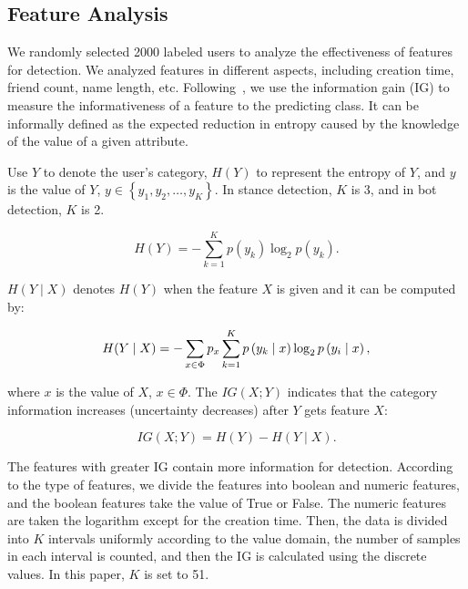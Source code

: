 \documentclass[10pt,twocolumn,letterpaper]{article}
\begin{document}
\subsection{Feature Analysis}
\label{sec:datapre-4}
We randomly selected 2000 labeled users to analyze the effectiveness of features for detection. We analyzed features in different aspects, including creation time, friend count, name length, etc. Following~\cite{Alpher10}, we use the information gain (IG) to measure the informativeness of a feature to the predicting class. It can be informally defined as the expected reduction in entropy caused by the knowledge of the value of a given attribute.

Use $Y$ to denote the user's category, $H(Y)$ to represent the entropy of $Y$, and $y$ is the value of $Y$, $y \in\left\{y_{1}, y_{2}, \ldots, y_{K}\right\}$. In stance detection, $K$ is 3, and in bot detection, $K$ is 2.

\begin{equation}
\label{equ:1}
H(Y)=-\sum_{k=1}^{K} p\left(y_{k}\right) \log _{2} p\left(y_{k}\right).
\end{equation}

$H(Y \mid X)$ denotes $H(Y)$ when the feature $X$ is given and it can be computed by:

\begin{equation}
\label{equ:2}
\vspace{-0.2cm}
H(Y \mid X)=-\sum_{x \in \Phi} p_{x} \sum_{k=1}^{K} p\left(y_{k} \mid x\right) \log _{2} p\left(y_{i} \mid x\right),
\end{equation}

where $x$ is the value of $X$, $x \in \Phi$. The $IG(X ; Y)$ indicates that the category information increases (uncertainty decreases) after $Y$ gets feature $X$:


\begin{equation}
\label{equ:3}
IG(X ; Y)=H(Y)-H(Y \mid X).
\end{equation}

The features with greater IG contain more information for detection. According to the type of features, we divide the features into boolean and numeric features, and the boolean features take the value of True or False. The numeric features are taken the logarithm except for the creation time. Then, the data is divided into $K$ intervals uniformly according to the value domain, the number of samples in each interval is counted, and then the IG is calculated using the discrete values. In this paper, $K$ is set to 51.
\end{document}
